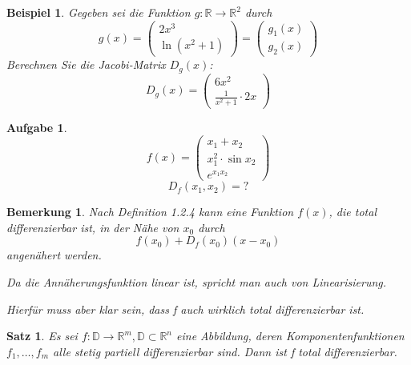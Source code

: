 \documentclass[12pt,a4paper]{scrreprt}
\newtheorem{bemerkung}[defi]{Bemerkung}
\newtheorem{beispiel}[defi]{Beispiel}
\newtheorem{satz}[defi]{Satz}
\newtheorem{aufg}[defi]{Aufgabe}
\begin{document}
\begin{beispiel}
	Gegeben sei die Funktion $g:\mathbb{R}\to\mathbb{R}^2$ durch \[g(x)=\begin{pmatrix}2x^3 \\ \ln(x^2+1)
	\end{pmatrix} = \begin{pmatrix}
	g_1(x) \\ g_2(x)
	\end{pmatrix}\]
	Berechnen Sie die Jacobi-Matrix $D_g(x)$:
	\[D_g(x)=\begin{pmatrix}6x^2 \\ \frac{1}{x^2+1}\cdot2x\end{pmatrix}\]
\end{beispiel}

\begin{aufg}
	\[f(x)=\begin{pmatrix}
	x_1 + x_2 \\
	x_1^2\cdot\sin x_2 \\
	e^{x_1x_2}
	\end{pmatrix}\]
	\[D_f(x_1,x_2)=?\]
\end{aufg}

\begin{bemerkung}
	Nach Definition 1.2.4 kann eine Funktion $f(x)$, die total differenzierbar ist, in der Nähe von $x_0$ durch \[f(x_0)+D_f(x_0)(x-x_0)\] angenähert werden.
	
	Da die Annäherungsfunktion linear ist, spricht man auch von Linearisierung.
	
	Hierfür muss aber klar sein, dass f auch wirklich total differenzierbar ist.
\end{bemerkung}

\begin{satz}
	Es sei $f:\mathbb{D}\to \mathbb{R}^m,\mathbb{D}\subset\mathbb{R}^n$ eine Abbildung, deren Komponentenfunktionen $f_1,\dots,f_m$ alle stetig partiell differenzierbar sind. Dann ist f total differenzierbar.
\end{satz}
\end{document}
